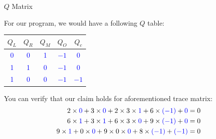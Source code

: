 \documentclass{zkdl-presentation-template}
\begin{document}
    \begin{frame}{$Q$ Matrix}
        \begin{example}
            For our program, we would have a following $Q$ table:
            \begin{center}
                \begin{tabular}{|c|c|c|c|c|}
                    \hline
                    $Q_L$ & $Q_R$ & $Q_M$ & $Q_O$ & $Q_c$ \\ 
                    \hline
                    \textcolor{blue}{0} & \textcolor{blue}{0} & \textcolor{blue}{1} & \textcolor{blue}{$-1$} & \textcolor{blue}{0} \\ 
                    \hline
                    \textcolor{blue}{1} & \textcolor{blue}{1} & \textcolor{blue}{0} & \textcolor{blue}{$-1$} & \textcolor{blue}{0} \\ 
                    \hline
                    \textcolor{blue}{1} & \textcolor{blue}{0} & \textcolor{blue}{0} & \textcolor{blue}{$-1$} & \textcolor{blue}{$-1$} \\ 
                    \hline
                \end{tabular}
            \end{center}

            You can verify that our claim holds for aforementioned trace matrix:
            \begin{align*}
              2 \times \textcolor{blue}{0} + 3 \times \textcolor{blue}{0} + 2 \times 3 \times \textcolor{blue}{1} + 6 \times \textcolor{blue}{(-1)} + \textcolor{blue}{0} &= 0 \\
              6 \times \textcolor{blue}{1} + 3 \times \textcolor{blue}{1} + 6 \times 3 \times \textcolor{blue}{0} + 9 \times \textcolor{blue}{(-1)} + \textcolor{blue}{0} &= 0 \\
              9 \times \textcolor{blue}{1} + 0 \times \textcolor{blue}{0} + 9 \times 0 \times \textcolor{blue}{0} + 8 \times \textcolor{blue}{(-1)} + \textcolor{blue}{(-1)} &= 0 
            \end{align*}
        \end{example}
    \end{frame}
\end{document}
